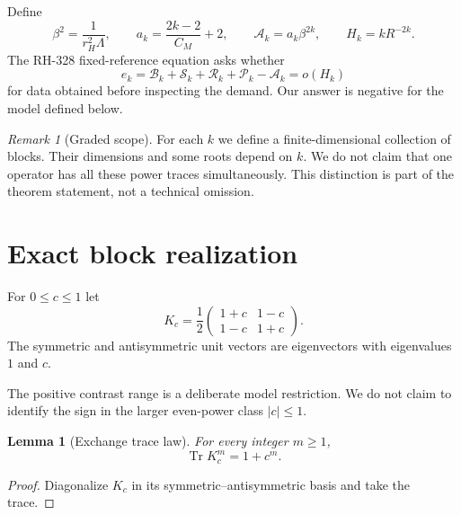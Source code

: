 \documentclass[11pt]{article}
\newtheorem{lemma}[theorem]{Lemma}
\theoremstyle{remark}
\newtheorem{remark}[theorem]{Remark}
\newcommand{\Tr}{\operatorname{Tr}}
\newcommand{\cA}{\mathcal A}
\newcommand{\cB}{\mathcal B}
\newcommand{\cP}{\mathcal P}
\newcommand{\cR}{\mathcal R}
\newcommand{\cS}{\mathcal S}
\begin{document}
Define
\begin{equation}
 \beta^2=\frac{1}{r_H^2\Lambda},
 \qquad
 a_k=\frac{2k-2}{C_M}+2,
 \qquad
 \cA_k=a_k\beta^{2k},
 \qquad
 H_k=kR^{-2k}.
 \label{eq:scales}
\end{equation}
The RH-328 fixed-reference equation asks whether
\begin{equation}
 e_k=\cB_k+\cS_k+\cR_k+\cP_k-\cA_k=o(H_k)
 \label{eq:joint-ledger}
\end{equation}
for data obtained before inspecting the demand.  Our answer is negative for
the model defined below.

\begin{remark}[Graded scope]
For each $k$ we define a finite-dimensional collection of blocks.  Their
dimensions and some roots depend on $k$.  We do not claim that one operator
has all these power traces simultaneously.  This distinction is part of the
theorem statement, not a technical omission.
\end{remark}

\section{Exact block realization}

For $0\le c\le1$ let
\begin{equation}
 K_c=\frac12
 \begin{pmatrix}1+c&1-c\\1-c&1+c\end{pmatrix}.
 \label{eq:exchange}
\end{equation}
The symmetric and antisymmetric unit vectors are eigenvectors with
eigenvalues $1$ and $c$.

The positive contrast range is a deliberate model restriction.  We do not
claim to identify the sign in the larger even-power class $|c|\le1$.

\begin{lemma}[Exchange trace law]
For every integer $m\ge1$,
\begin{equation}
 \Tr K_c^m=1+c^m.
 \label{eq:exchange-trace}
\end{equation}
\end{lemma}

\begin{proof}
Diagonalize $K_c$ in its symmetric--antisymmetric basis and take the trace.
\end{proof}
\end{document}
